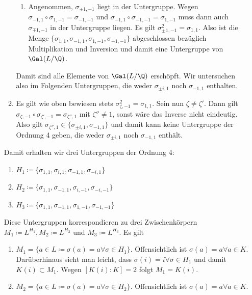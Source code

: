 \documentclass{article}
\begin{document}
\begin{enumerate}[(a)]
\begin{enumerate}[1.]
\begin{enumerate}
                \item Angenommen, $\sigma_{\pm 1, -1}$ liegt in der Untergruppe. Wegen $\sigma_{-1,1} \circ \sigma_{1,-1} = \sigma_{-1, -1}$ und $\sigma_{-1,1} \circ \sigma_{-1, -1} = \sigma_{1, -1}$ muss dann auch $\sigma_{\mp 1, -1}$ in der Untergruppe liegen.
                Es gilt $\sigma_{\pm 1, -1}^2 = \sigma_{1,1}$.
                Also ist die Menge $\{\sigma_{1,1}, \sigma_{-1,1}, \sigma_{1,-1}, \sigma_{-1,-1}\}$ abgeschlossen bezüglich Multiplikation und Inversion und damit eine Untergruppe von $\Gal(L/\Q)$.
            \end{enumerate}
            Damit sind alle Elemente von $\Gal(L/\Q)$ erschöpft. Wir untersuchen also im Folgenden Untergruppen, die weder $\sigma_{\pm i,1}$ noch $\sigma_{-1, 1}$ enthalten. 
            \item Es gilt wie oben bewiesen stets $\sigma_{\zeta, -1}^2 = \sigma_{1,1}$. Sein nun $\zeta \neq \zeta'$. Dann gilt $\sigma_{\zeta, -1} \circ \sigma_{\zeta', -1} = \sigma_{\zeta'', 1}$ mit $\zeta'' \neq 1$, sonst wäre das Inverse nicht eindeutig. Also gilt $\sigma_{\zeta'', 1} \in \{\sigma_{\pm i,1}, \sigma_{-1, 1}\}$ und damit kann keine Untergruppe der Ordnung 4 geben, die weder $\sigma_{\pm i,1}$ noch $\sigma_{-1, 1}$ enthält.
        \end{enumerate}
        Damit erhalten wir drei Untergruppen der Ordnung 4: 
        \begin{enumerate}[1.]
            \item $H_1 \coloneqq \{\sigma_{1,1}, \sigma_{ i,1}, \sigma_{-1,1}, \sigma_{-i, 1}\}$
            \item $H_2 \coloneqq \{\sigma_{1,1}, \sigma_{-1,1}, \sigma_{i,-1}, \sigma_{-i,-1}\}$
            \item $H_3 \coloneqq \{\sigma_{1,1}, \sigma_{-1,1}, \sigma_{1,-1}, \sigma_{-1,-1}\}$
        \end{enumerate}
        Diese Untergruppen korrespondieren zu drei Zwischenkörpern $M_1 \coloneqq L^{H_1}, M_2 \coloneqq L^{H_2}$ und $M_3 \coloneqq L^{H_3}$. Es gilt
        \begin{enumerate}[1.]
            \item $M_1 = \{a \in L\coloneqq \sigma(a) = a \forall \sigma \in H_1\}$. Offensichtlich ist $\sigma(a) = a\forall a \in K$. Darüberhinaus sieht man leicht, dass $\sigma(i) = i \forall \sigma\in H_1$ und damit $K(i) \subset M_1$. Wegen $[K(i)\colon K] = 2$ folgt $M_1 = K(i)$.
            \item $M_2 = \{a \in L\coloneqq \sigma(a) = a \forall \sigma \in H_2\}$. Offensichtlich ist $\sigma(a) = a\forall a \in K$. 

\end{enumerate}
\end{enumerate}
\end{document}

